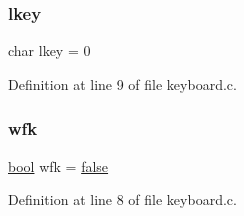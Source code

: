 \subsubsection{\texorpdfstring{lkey}{lkey}}
{\footnotesize\ttfamily char lkey = 0}



Definition at line 9 of file keyboard.\+c.

\mbox{\label{a00038_a6ddd5223379778858edc46ffbec19775_a6ddd5223379778858edc46ffbec19775}} 
\subsubsection{\texorpdfstring{wfk}{wfk}}
{\footnotesize\ttfamily \hyperlink{a00140_af6a258d8f3ee5206d682d799316314b1_af6a258d8f3ee5206d682d799316314b1}{bool} wfk = \hyperlink{a00140_af6a258d8f3ee5206d682d799316314b1_af6a258d8f3ee5206d682d799316314b1ae9de385ef6fe9bf3360d1038396b884c}{false}}



Definition at line 8 of file keyboard.\+c.

